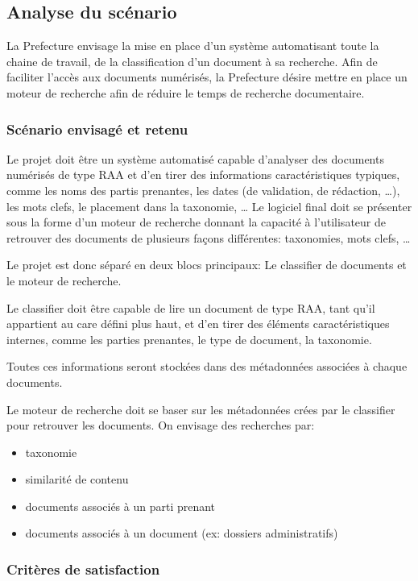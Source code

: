 
\subsection{Analyse du scénario}
La Prefecture envisage la mise en place d'un système automatisant toute la chaine de travail, de la classification d'un document à sa recherche.
Afin de faciliter l'accès aux documents numérisés, la Prefecture désire mettre en place un moteur de recherche afin de réduire le temps de recherche documentaire.



\subsubsection{Scénario envisagé et retenu}
Le projet doit être un système automatisé capable d'analyser des documents numérisés de type RAA et d'en tirer des informations caractéristiques typiques, comme les noms des partis prenantes,  les dates (de validation, de rédaction, \ldots), les mots clefs, le placement dans la taxonomie, \ldots 
Le logiciel final doit se présenter sous la forme d'un moteur de recherche donnant la capacité à l'utilisateur de retrouver des documents de plusieurs façons différentes: taxonomies, mots clefs, \ldots 

\par
Le projet est donc séparé en deux blocs principaux:
Le classifier de documents et le moteur de recherche.

Le classifier doit être capable de lire un document de type RAA, tant qu'il appartient au care défini plus haut, et d'en tirer des éléments caractéristiques internes, comme les parties prenantes, le type de document, la taxonomie.

Toutes ces informations seront stockées dans des métadonnées associées à chaque documents.


Le moteur de recherche doit se baser sur les métadonnées crées par le classifier pour retrouver les documents.
On envisage des recherches par:
\begin{itemize}
\item taxonomie
\item similarité de contenu
\item documents associés à un parti prenant 
\item documents associés à un document (ex: dossiers administratifs)
\end{itemize}



\subsubsection{Critères de satisfaction}

